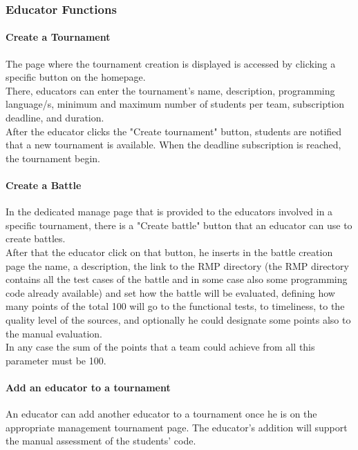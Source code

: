 \subsubsection{Educator Functions}

\paragraph{Create a Tournament}
The page where the tournament creation is displayed is accessed by clicking a specific button on the homepage.\\
There, educators can enter the tournament's name, description, programming language/s, minimum and maximum number of students per team, subscription deadline, and duration.\\ 
After the educator clicks the "Create tournament" button, students are notified that a new tournament is available.
When the deadline subscription is reached, the tournament begin.

\paragraph{Create a Battle}
In the dedicated manage page that is provided to the educators involved in a specific tournament, there is a "Create battle" button that an educator can use to create battles.\\
After that the educator click on that button, he inserts in the battle creation page the name, a description, the link to the RMP directory (the RMP directory contains all the test cases of the battle
and in some case also some programming code already available) and set how the battle will be evaluated, defining how many points of the total 100 will go to the functional tests, to timeliness, to 
the quality level of the sources, and optionally he could designate some points also to the manual evaluation.\\
In any case the sum of the points that a team could achieve from all this parameter must be 100.

\paragraph{Add an educator to a tournament}
An educator can add another educator to a tournament once he is on the appropriate management tournament page. The educator's addition will support the manual assessment of the students' code.

